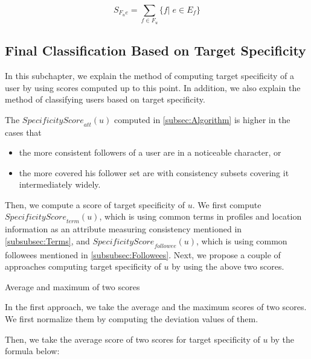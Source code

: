 \vspace{-1ex}
\[
 S_{F_ue} =  \sum_{f \in F_u} \{f|\;e \in E_f \}
\]
\vspace{-2ex}


\subsection{Final Classification Based on Target Specificity}
\label{subsec:Final Classification}

In this subchapter, we explain the method of computing target
specificity of a user by using scores computed up to this
point.  In addition, we also explain the method of classifying users
based on target specificity.

The $\mathit{SpecificityScore}_{{\mathit{att}}}(u)$ computed in
\ref{subsec:Algorithm} is higher in the cases that

\begin{itemize}
\item the more consistent followers of a user are in a noticeable
      character, or
\item the more covered his follower set are with consistency
      subsets covering it intermediately widely.
\end{itemize}

Then, we compute a score of target specificity of $u$. We first
compute $\mathit{SpecificityScore}_{{\mathit{term}}}(u)$, which is using
common terms in profiles and location information as an attribute
measuring consistency mentioned in \ref{subsubsec:Terms}, and
$\mathit{SpecificityScore}_{{\mathit{followee}}}(u)$, which is using
common followees mentioned in \ref{subsubsec:Followees}.  Next, we propose
a couple of approaches computing target specificity of $u$ by using the
above two scores.

\begin{description}
\bf{\item[(1)] Average and maximum of two scores}
\label{item:Avg and Max}
\end{description}

In the first approach, we take the average and the maximum scores of two
scores.  We first normalize them by
computing the deviation values of them.

Then, we take the average score of two scores for target specificity of
$u$ by the formula below:


